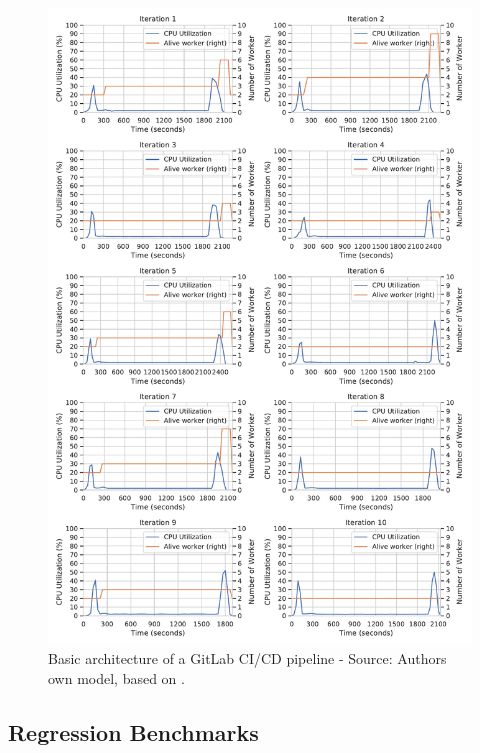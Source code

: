 \begin{figure}[h]
\centering
\includegraphics[scale=0.4]{images/07_evaluation/mortgage/mortgage_auto-scaler_performance}
\caption{Basic architecture of a GitLab CI/CD pipeline - Source: Authors own model, based on \cite{Gitlab2020Docs}.}
\label{fig:07_mortgage_static-cpu_results}
\end{figure}


\subsection{Regression Benchmarks}

